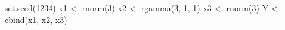 \begin{Schunk}
\begin{Sinput}
  set.seed(1234)
  x1 <- rnorm(3)
  x2 <- rgamma(3, 1, 1)
  x3 <- rnorm(3)
  Y <- cbind(x1, x2, x3)
\end{Sinput}
\end{Schunk}
